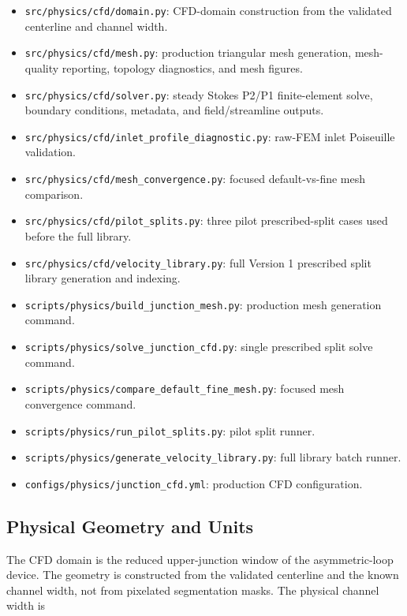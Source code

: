 \begin{itemize}
  \item \texttt{src/physics/cfd/domain.py}: CFD-domain construction from the
        validated centerline and channel width.
  \item \texttt{src/physics/cfd/mesh.py}: production triangular mesh generation,
        mesh-quality reporting, topology diagnostics, and mesh figures.
  \item \texttt{src/physics/cfd/solver.py}: steady Stokes P2/P1 finite-element
        solve, boundary conditions, metadata, and field/streamline outputs.
  \item \texttt{src/physics/cfd/inlet\_profile\_diagnostic.py}: raw-FEM inlet
        Poiseuille validation.
  \item \texttt{src/physics/cfd/mesh\_convergence.py}: focused default-vs-fine
        mesh comparison.
  \item \texttt{src/physics/cfd/pilot\_splits.py}: three pilot prescribed-split
        cases used before the full library.
  \item \texttt{src/physics/cfd/velocity\_library.py}: full Version 1 prescribed
        split library generation and indexing.
  \item \texttt{scripts/physics/build\_junction\_mesh.py}: production mesh
        generation command.
  \item \texttt{scripts/physics/solve\_junction\_cfd.py}: single prescribed
        split solve command.
  \item \texttt{scripts/physics/compare\_default\_fine\_mesh.py}: focused mesh
        convergence command.
  \item \texttt{scripts/physics/run\_pilot\_splits.py}: pilot split runner.
  \item \texttt{scripts/physics/generate\_velocity\_library.py}: full library
        batch runner.
  \item \texttt{configs/physics/junction\_cfd.yml}: production CFD
        configuration.
\end{itemize}

\subsection{Physical Geometry and Units}

The CFD domain is the reduced upper-junction window of the asymmetric-loop
device. The geometry is constructed from the validated centerline and the known
channel width, not from pixelated segmentation masks. The physical channel
width is

